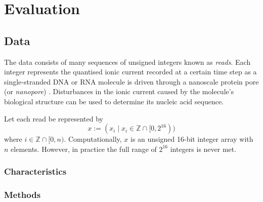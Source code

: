 \chapter{Evaluation} \label{chap:evaluation}

\section{Data} \label{sec:data}

The data consists of many sequences of unsigned integers known as \textit{reads}. Each integer represents the quantised ionic current recorded at a certain time step as a single-stranded DNA or RNA molecule is driven through a nanoscale protein pore (or \textit{nanopore}) \cite{Wang2021}. Disturbances in the ionic current caused by the molecule's biological structure can be used to determine its nucleic acid sequence.

Let each read be represented by
\[ x := (x_i\mid x_i \in \mathbb{Z} \cap [0, 2^{16})) \]
where $i\in \mathbb{Z}\cap [0, n)$. Computationally, $x$ is an unsigned 16-bit integer array with $n$ elements. However, in practice the full range of $2^{16}$ integers is never met.

\subsection{Characteristics}


\subsection{Methods}


